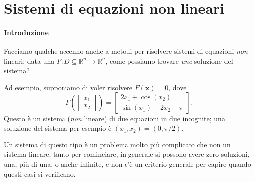 \documentclass[a4paper]{report}
\theoremstyle{definiton}
\theoremstyle{remark}
\begin{document}


\section{Sistemi di equazioni non lineari}

\paragraph{Introduzione} Facciamo qualche accenno anche a metodi per risolvere sistemi di equazioni \emph{non} lineari: data una $F: D \subseteq \mathbb{R}^n \to \mathbb{R}^n$, come possiamo trovare \emph{una} soluzione del sistema?

Ad esempio, supponiamo di voler risolvere $F(\mathbf{x})=0$, dove
\begin{equation} \label{esempiosistemanonlin}
    F\left(\begin{bmatrix}
        x_1\\ x_2
    \end{bmatrix}\right) = \begin{bmatrix}
        2x_1 + \cos(x_2)\\
        \sin(x_1) + 2x_2 - \pi
    \end{bmatrix}.
\end{equation}
Questo è un sistema (\emph{non} lineare) di due equazioni in due incognite; una soluzione del sistema per esempio è $(x_1, x_2) = (0,\pi/2)$.

Un sistema di questo tipo è un problema molto più complicato che non un sistema lineare; tanto per cominciare, in generale si possono avere zero soluzioni, una, più di una, o anche infinite, e non c'è un criterio generale per capire quando questi casi si verificano.
\end{document}
